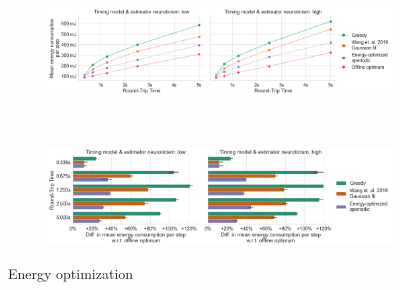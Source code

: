 

\begin{figure}
    \centering
    \begin{subfigure}[t]{\textwidth}
        \centering
        \includegraphics[width=\textwidth]{figs/new_model/energy_optimization.png}
        \caption{}
    \end{subfigure}\\
    \medskip
    \begin{subfigure}[t]{\textwidth}
        \centering
        \includegraphics[width=\textwidth]{figs/new_model/energy_optimization_diff.png}
        \caption{}
    \end{subfigure}
    \caption{Energy optimization}
\end{figure}